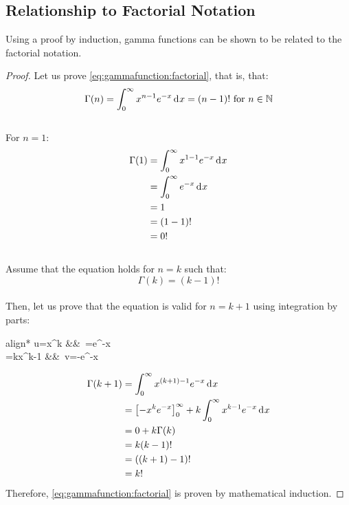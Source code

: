 \documentclass[12pt]{article}
\begin{document}

\pagebreak
\subsection{Relationship to Factorial Notation}
Using a proof by induction, gamma functions can be shown to be related to the factorial notation.
\begin{proof}
	Let us prove \autoref{eq:gammafunction:factorial}, that is, that:\\[-18pt]
	\begin{equation}
		\Gamma(n) = \int^\infty_0 x^{n-1}e^{-x}\mathop{}\!\mathrm{d^{}}x = (n-1)!\text{ for }n\in\mathbb{N}
	\end{equation}\\[-30pt]
	For $n=1$:\\[-18pt]
	\begin{equation}
		\begin{split}
			\Gamma(1)	&=	\int^\infty_0 x^{1-1}e^{-x}\mathop{}\!\mathrm{d^{}}x\\
						&=	\int^\infty_0 e^{-x}\mathop{}\!\mathrm{d^{}}x\\
						&=	1\\
						&=	(1-1)!\\
						&=	0!
		\end{split}
	\end{equation}\\[-24pt]
	Assume that the equation holds for $n=k$ such that:\\[-18pt]
	\begin{equation}
		\Gamma(k) = (k-1)!
	\end{equation}\\[-30pt]
	Then, let us prove that the equation is valid for $n=k+1$ using integration by parts:\\[-12pt]
	\begin{empheq}[box=\widefbox]{align*}
		u=x^{k}						&&\,	=e^{-x}\\
		=kx^{k-1}	&&\,	v=-e^{-x}
	\end{empheq}
	\begin{equation}
		\begin{split}
			\Gamma(k+1)	&=	\int^\infty_0 x^{(k+1)-1}e^{-x}\mathop{}\!\mathrm{d^{}}x\\
						&=	\left[-x^k e^{-x}\right]^\infty_0 + k\int^\infty_0 x^{k-1}e^{-x}\mathop{}\!\mathrm{d^{}}x\\
						&=	0 +k\Gamma(k)\\
						&=	k(k-1)!\\
						&=	((k+1)-1)!\\
						&=	k!
		\end{split}
	\end{equation}
	Therefore, \autoref{eq:gammafunction:factorial} is proven by mathematical induction.
\end{proof}
\end{document}
